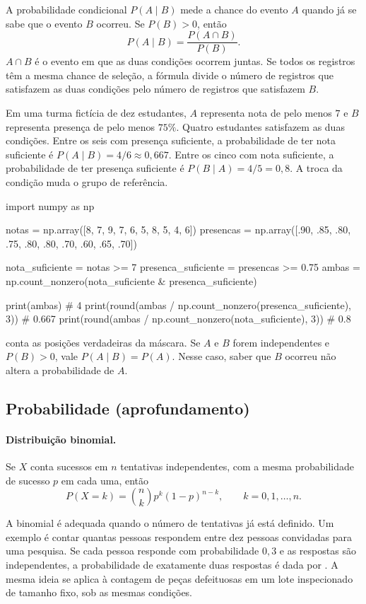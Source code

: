 A probabilidade condicional \(P(A\mid B)\) mede a chance do evento \(A\) quando já se sabe que o evento \(B\) ocorreu. Se \(P(B)>0\), então
\[
  P(A\mid B)=\frac{P(A\cap B)}{P(B)}.
\]
\(A\cap B\) é o evento em que as duas condições ocorrem juntas. Se todos os registros têm a mesma chance de seleção, a fórmula divide o número de registros que satisfazem as duas condições pelo número de registros que satisfazem \(B\).

Em uma turma fictícia de dez estudantes, \(A\) representa nota de pelo menos \(7\) e \(B\) representa presença de pelo menos \(75\%\). Quatro estudantes satisfazem as duas condições. Entre os seis com presença suficiente, a probabilidade de ter nota suficiente é \(P(A\mid B)=4/6\approx 0{,}667\). Entre os cinco com nota suficiente, a probabilidade de ter presença suficiente é \(P(B\mid A)=4/5=0{,}8\). A troca da condição muda o grupo de referência.

\begin{exemplo}
import numpy as np

notas = np.array([8, 7, 9, 7, 6, 5, 8, 5, 4, 6])
presencas = np.array([.90, .85, .80, .75, .80, .80, .70, .60, .65, .70])

nota_suficiente = notas >= 7
presenca_suficiente = presencas >= 0.75
ambas = np.count_nonzero(nota_suficiente & presenca_suficiente)

print(ambas)  # 4
print(round(ambas / np.count_nonzero(presenca_suficiente), 3))  # 0.667
print(round(ambas / np.count_nonzero(nota_suficiente), 3))      # 0.8
\end{exemplo}

 conta as posições verdadeiras da máscara. Se \(A\) e \(B\) forem independentes e \(P(B)>0\), vale \(P(A\mid B)=P(A)\). Nesse caso, saber que \(B\) ocorreu não altera a probabilidade de \(A\).

\subsection{Probabilidade (aprofundamento)}

\paragraph{Distribuição binomial.}
Se \(X\) conta sucessos em \(n\) tentativas independentes, com a mesma probabilidade de sucesso \(p\) em cada uma, então
\[
  P(X=k)=\binom{n}{k}p^k(1-p)^{n-k},
  \qquad k=0,1,\ldots,n.
\]

A binomial é adequada quando o número de tentativas já está definido. Um exemplo é contar quantas pessoas respondem entre dez pessoas convidadas para uma pesquisa. Se cada pessoa responde com probabilidade \(0{,}3\) e as respostas são independentes, a probabilidade de exatamente duas respostas é dada por . A mesma ideia se aplica à contagem de peças defeituosas em um lote inspecionado de tamanho fixo, sob as mesmas condições.

